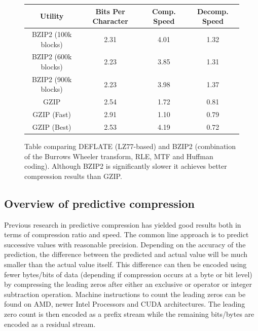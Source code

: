 \begin{figure}[h!]
\begin{mdframed}
\centering
\begin{tabular}{|c|c|c|c|}
 \hline
 Utility & Bits Per Character & Comp. Speed & Decomp. Speed \\
 \hline
 BZIP2 (100k blocks) & 2.31 & 4.01  & 1.32 \\
 \hline
 BZIP2 (600k blocks) & 2.23 & 3.85 & 1.31 \\ 
 \hline
 BZIP2 (900k blocks) & 2.23 & 3.98  & 1.37 \\
 \hline
 GZIP & 2.54 & 1.72 & 0.81 \\
 \hline
 GZIP (Fast) & 2.91 & 1.10 & 0.79 \\
 \hline
 GZIP (Best) & 2.53 & 4.19 & 0.72 \\
 \hline
\end{tabular}
\caption{Table comparing DEFLATE (LZ77-based) and BZIP2 (combination of the Burrows Wheeler transform, RLE, MTF and Huffman coding). Although BZIP2 is significantly slower
it achieves better compression results than GZIP.}
\label{BZIP2_VS_GZIP}
\end{mdframed}
\end{figure}

\subsection{Overview of predictive compression}
Previous research \cite{1607248,4589203,engelson2000lossless,lindstrom2006fast,O'Neil:2011:FDC:1964179.1964189,4976448,CGF:CGF681} in predictive compression has yielded good results both in terms of compression ratio and speed. 
The common line approach is to predict successive values with reasonable precision. Depending on the accuracy of the prediction, the difference between the predicted and actual value will be much smaller than the actual value itself. 
This difference can then be encoded using fewer bytes/bits of data (depending if compression occurs at a byte or bit level) by compressing the leading zeros after either an exclusive or operator or integer subtraction 
operation. Machine instructions to count the leading zeros can be found on AMD, newer Intel Processors and CUDA architectures. The leading zero count is then encoded as a prefix stream while the remaining bits/bytes 
are encoded as a residual stream.

